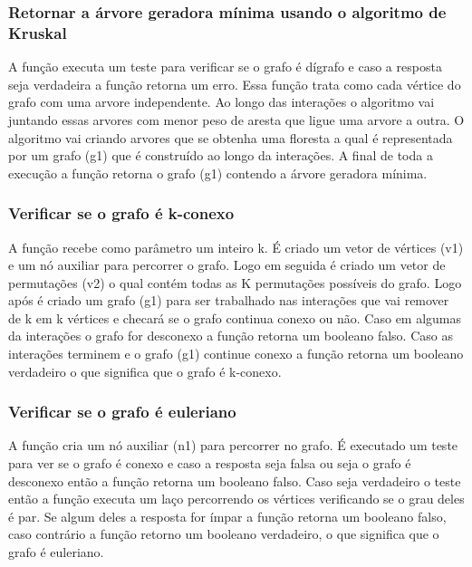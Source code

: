 \documentclass[a4paper, 12pt]{article}
\begin{document}
\subsubsection{Retornar a árvore geradora mínima usando o algoritmo de Kruskal}
A função executa um teste para verificar se o grafo é dígrafo e caso a resposta seja verdadeira a função retorna um erro. Essa função trata como cada vértice do grafo com uma arvore independente. Ao longo das interações o algoritmo vai juntando essas arvores com menor peso de aresta que ligue uma arvore a outra. O algoritmo vai criando arvores que se obtenha uma floresta a qual é representada por um grafo (g1) que é construído ao longo da interações. A final de toda a execução a função retorna o grafo (g1) contendo a árvore geradora mínima.

\subsubsection{Verificar se o grafo é k-conexo}
A função recebe como parâmetro um inteiro k. É criado um vetor de vértices (v1) e um nó auxiliar para percorrer o grafo. Logo em seguida é criado um vetor de permutações (v2) o qual contém todas as K permutações possíveis do grafo. Logo após é criado um grafo (g1) para ser trabalhado nas interações que vai remover de k em k vértices e checará se o grafo continua conexo ou não. Caso em algumas da interações o grafo for desconexo a função retorna um booleano falso. Caso as interações terminem e o grafo (g1) continue conexo a função retorna um booleano verdadeiro o que significa que o grafo é k-conexo.

\subsubsection{Verificar se o grafo é euleriano}
A função cria um nó auxiliar (n1) para percorrer no grafo. É executado um teste para ver se o grafo é conexo e caso a resposta seja falsa ou seja o grafo é desconexo então a função retorna um booleano falso. Caso seja verdadeiro o teste então a função executa um laço percorrendo os vértices verificando se o grau deles é par. Se algum deles a resposta for ímpar a função retorna um booleano falso, caso contrário a função retorno um booleano verdadeiro, o que significa que o grafo é euleriano.
\end{document}
